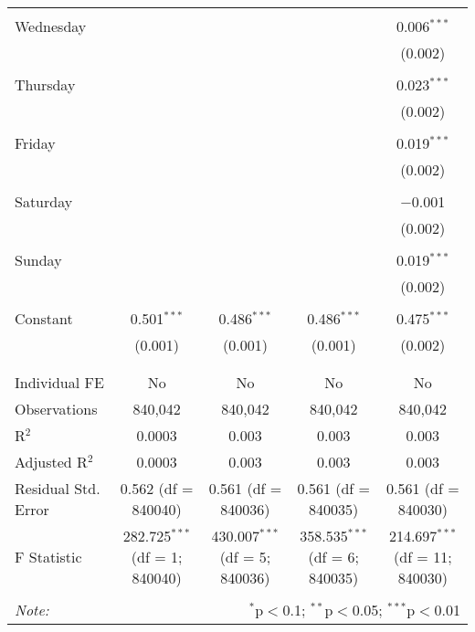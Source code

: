 \documentclass[
]{article}
\begin{document}
\begin{table}[!htbp]
{\begin{tabular}{@{\extracolsep{5pt}}lcccc}
  & & & & \\ 
 Wednesday &  &  &  & 0.006$^{***}$ \\ 
  &  &  &  & (0.002) \\ 
  & & & & \\ 
 Thursday &  &  &  & 0.023$^{***}$ \\ 
  &  &  &  & (0.002) \\ 
  & & & & \\ 
 Friday &  &  &  & 0.019$^{***}$ \\ 
  &  &  &  & (0.002) \\ 
  & & & & \\ 
 Saturday &  &  &  & $-$0.001 \\ 
  &  &  &  & (0.002) \\ 
  & & & & \\ 
 Sunday &  &  &  & 0.019$^{***}$ \\ 
  &  &  &  & (0.002) \\ 
  & & & & \\ 
 Constant & 0.501$^{***}$ & 0.486$^{***}$ & 0.486$^{***}$ & 0.475$^{***}$ \\ 
  & (0.001) & (0.001) & (0.001) & (0.002) \\ 
  & & & & \\ 
\hline \\[-1.8ex] 
Individual FE & No & No & No & No \\ 
Observations & 840,042 & 840,042 & 840,042 & 840,042 \\ 
R$^{2}$ & 0.0003 & 0.003 & 0.003 & 0.003 \\ 
Adjusted R$^{2}$ & 0.0003 & 0.003 & 0.003 & 0.003 \\ 
Residual Std. Error & 0.562 (df = 840040) & 0.561 (df = 840036) & 0.561 (df = 840035) & 0.561 (df = 840030) \\ 
F Statistic & 282.725$^{***}$ (df = 1; 840040) & 430.007$^{***}$ (df = 5; 840036) & 358.535$^{***}$ (df = 6; 840035) & 214.697$^{***}$ (df = 11; 840030) \\ 
\hline 
\hline \\[-1.8ex] 
\textit{Note:}  & \multicolumn{4}{r}{$^{*}$p$<$0.1; $^{**}$p$<$0.05; $^{***}$p$<$0.01} \\ 
\end{tabular}
} 
\end{table} 
\newpage
\end{document}
